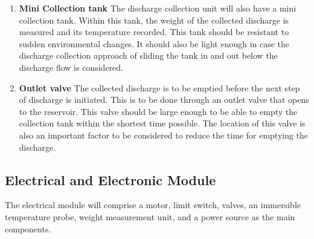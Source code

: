 \begin{enumerate}
    \item \textbf{Mini Collection tank} \newline
    The discharge collection unit will also have a mini collection tank. Within this tank, the weight of the collected discharge is measured and its temperature recorded. This tank should be resistant to sudden environmental changes. It should also be light enough in case the discharge collection approach of sliding the tank in and out below the discharge flow is considered.  
    \item \textbf{Outlet valve} \newline 
    The collected discharge is to be emptied before the next step of discharge is initiated. This is to be done through an outlet valve that opens to the reservoir. This valve should be large enough to be able to empty the collection tank within the shortest time possible. The location of this valve is also an important factor to be considered to reduce the time for emptying the discharge. 
\end{enumerate}


\subsection{Electrical and Electronic Module}
The electrical module will comprise a motor, limit switch, valves, an immersible temperature probe, weight measurement unit, and a power source as the main components.

